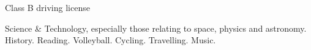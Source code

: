 \documentclass[helvetica,openbib,logo,notitle,flagCMYK,totpages, english]{europecv}
\begin{document}
\begin{europecv}
{
Class B driving license
}


{
Science \& Technology, especially those relating to space, physics and astronomy. History. Reading. Volleyball. Cycling. Travelling. Music.
}


\end{europecv}
\end{document}
